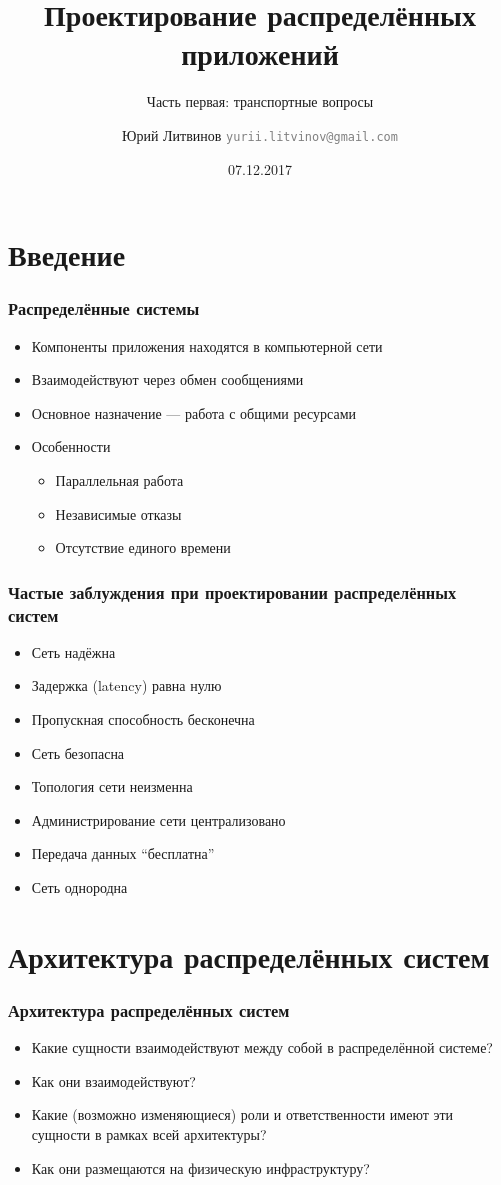 \documentclass[xetex,mathserif,serif]{beamer}
\title{Проектирование распределённых приложений}
\subtitle{Часть первая: транспортные вопросы}
\author[Юрий Литвинов]{Юрий Литвинов \newline \textcolor{gray}{\small\texttt{yurii.litvinov@gmail.com}}}
\date{07.12.2017}
\begin{document}
	
	\frame{\titlepage}

	\section{Введение}

	\begin{frame}
		\frametitle{Распределённые системы}
		\begin{itemize}
			\item Компоненты приложения находятся в компьютерной сети
			\item Взаимодействуют через обмен сообщениями
			\item Основное назначение --- работа с общими ресурсами
			\item Особенности
			\begin{itemize}
				\item Параллельная работа
				\item Независимые отказы
				\item Отсутствие единого времени
			\end{itemize}
		\end{itemize}
	\end{frame}

	\begin{frame}
		\frametitle{Частые заблуждения при проектировании распределённых систем}
		\begin{itemize}
			\item Сеть надёжна
			\item Задержка (latency) равна нулю
			\item Пропускная способность бесконечна
			\item Сеть безопасна
			\item Топология сети неизменна
			\item Администрирование сети централизовано
			\item Передача данных ``бесплатна''
			\item Сеть однородна
		\end{itemize}
	\end{frame}

	\section{Архитектура распределённых систем}

	\begin{frame}
		\frametitle{Архитектура распределённых систем}
		\begin{itemize}
			\item Какие сущности взаимодействуют между собой в распределённой системе?
			\item Как они взаимодействуют?
			\item Какие (возможно изменяющиеся) роли и ответственности имеют эти сущности в рамках всей архитектуры?
			\item Как они размещаются на физическую инфраструктуру?
		\end{itemize}
	\end{frame}
\end{document}
